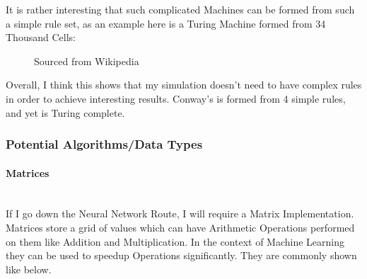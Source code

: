 \begin{flushleft}
                    \vspace{0.2cm}
                    It is rather interesting that such complicated Machines can be formed from such a simple rule set, as an example 
                    here is a Turing Machine formed from 34 Thousand Cells: \\

                    \begin{figure}[H]
                        \centering
                        \caption*{Sourced from Wikipedia}
                    \end{figure}

                    Overall, I think this shows that my simulation doesn't need to have complex rules in order to achieve 
                    interesting results. Conway's is formed from 4 simple rules, and yet is Turing complete.
            \subsubsection{Potential Algorithms/Data Types}
                \large
                \paragraph{Matrices} \mbox{} \\
                    If I go down the Neural Network Route, I will require a Matrix Implementation. Matrices store a grid of 
                    values which can have Arithmetic Operations performed on them like Addition and Multiplication. In the 
                    context of Machine Learning they can be used to speedup Operations significantly. They are commonly shown
                    like below. \\


\end{flushleft}
